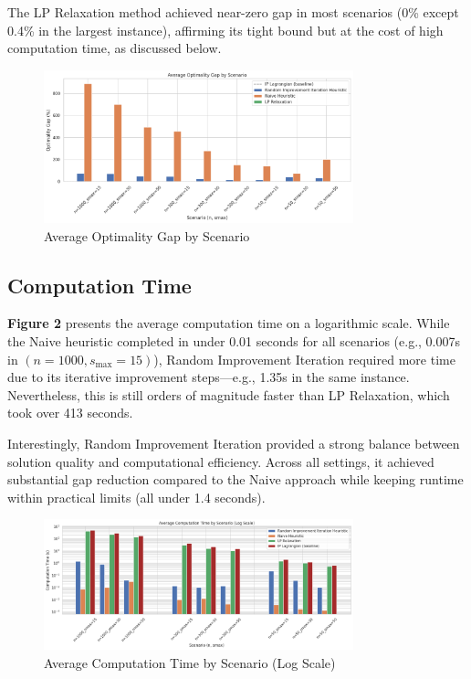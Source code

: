 The LP Relaxation method achieved near-zero gap in most scenarios (0\% except 0.4\% in the largest instance), affirming its tight bound but at the cost of high computation time, as discussed below.

\begin{figure}[H]
    \centering
    \includegraphics[width=0.8\textwidth]{assets/gap.png}
    \caption{Average Optimality Gap by Scenario}
    \label{fig:avg-optimality-gap}
\end{figure}

\subsection{Computation Time}

\textbf{Figure 2} presents the average computation time on a logarithmic scale. While the Naive heuristic completed in under 0.01 seconds for all scenarios (e.g., 0.007s in $(n=1000, s_{\max}=15)$), Random Improvement Iteration required more time due to its iterative improvement steps—e.g., 1.35s in the same instance. Nevertheless, this is still orders of magnitude faster than LP Relaxation, which took over 413 seconds.

Interestingly, Random Improvement Iteration provided a strong balance between solution quality and computational efficiency. Across all settings, it achieved substantial gap reduction compared to the Naive approach while keeping runtime within practical limits (all under 1.4 seconds). 

\begin{figure}[H]
    \centering
    \includegraphics[width=0.8\textwidth]{assets/time.png}
    \caption{Average Computation Time by Scenario (Log Scale)}
    \label{fig:avg-computation-time}
\end{figure}

